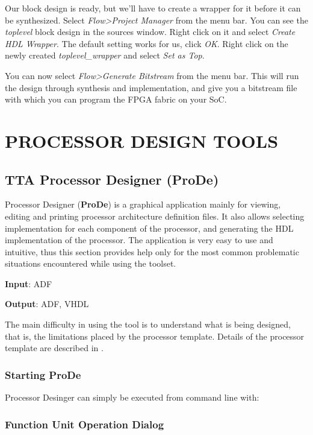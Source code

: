 \documentclass[twoside]{tceusermanual}
\begin{document}
Our block design is ready, but we'll have to create a wrapper for it before
it can be synthesized. Select \textit{Flow>Project Manager} from the menu bar.
You can see the \textit{toplevel} block design in the sources window. Right
click on it and select \textit{Create HDL Wrapper}. The default setting works
for us, click \textit{OK}. Right click on the newly created
\textit{toplevel\_wrapper} and select \textit{Set as Top}.

You can now select \textit{Flow>Generate Bitstream} from the menu bar. This will
run the design through synthesis and implementation, and give you a bitstream
file with which you can program the FPGA fabric on your SoC.

\chapter{PROCESSOR DESIGN TOOLS}
\label{chapter:procgen}

\section{TTA Processor Designer (ProDe)}
\label{sec:prode}

Processor Designer (\textbf{ProDe}) is a graphical application mainly for
viewing, editing and printing processor architecture definition files. 
It also allows selecting implementation for each component of the processor,
and generating the HDL implementation of the processor. The application is
very easy to use and intuitive, thus this section provides help only for the
most common problematic situations encountered while using the toolset.

\textbf{Input}: ADF

\textbf{Output}: ADF, VHDL

The main difficulty in using the tool is to understand what is being
designed, that is, the limitations placed by the processor template. 
Details of the processor template are described in \cite{ADF-specs}.


\subsection{Starting ProDe}

Processor Desinger can simply be executed from command line with:


\subsection{Function Unit Operation Dialog}
\end{document}
